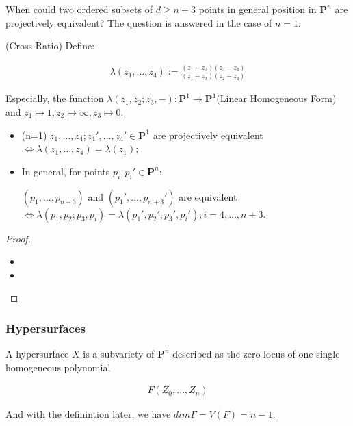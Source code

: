 \documentclass[Total.tex]{subfiles}
\begin{document}
			\begin{prob}
				 When could two ordered subsets of $d\geq n+3$ points in general position in $\mathbf{P}^n$ are projectively equivalent? The question is answered in the case of $n=1$:
			\end{prob}
			
			\begin{Def}
				(Cross-Ratio) Define:
				
				\begin{gather*}
					\lambda(z_1,\dots,z_4):=\frac{(z_1-z_2)(z_3-z_4)}{(z_1-z_3)(z_2-z_4)}
				\end{gather*}
			\end{Def}
			
			Especially, the function $\lambda(z_1,z_2;z_3,-):\mathbf{P}^1\rightarrow \mathbf{P}^1$(Linear Homogeneous Form) and $z_1\mapsto 1,z_2\mapsto \infty,z_3\mapsto 0$.
			
			\begin{proposition}
				\begin{itemize}
					\item (n=1) $z_1,\dots,z_4;z_1',\dots,z_4'\in \mathbf{P}^1$ are projectively equivalent$\Leftrightarrow \lambda(z_1,\dots,z_4)=\lambda(z_1)$;
					
					\item In general, for points $p_i,p_i'\in \mathbf{P}^n$:
					
					$(p_1,\dots,p_{n+3})$ and $(p_1',\dots,p_{n+3}')$ are equivalent$\Leftrightarrow　\lambda(p_1,p_2;p_3,p_i)=\lambda(p_1',p_2';p_3',p_i');i=4,\dots,n+3$.
				\end{itemize}
			\end{proposition}
			
			\begin{proof}
				\begin{itemize}
					\item 
					\item 
				\end{itemize}
			\end{proof}
			
			\subsubsection{Hypersurfaces}
			
			\begin{Def}
				A hypersurface $X$ is a subvariety of $\mathbf{P}^n$ described as the zero locus of one single homogeneous polynomial 
				
				\begin{gather*}
					F(Z_0,\dots,Z_n)
				\end{gather*}
				
				And with the definintion later, we have $dim\Gamma=V(F)=n-1$.
			\end{Def}
			
\end{document}

